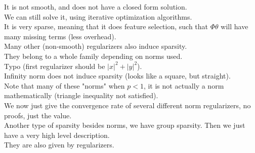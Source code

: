 \documentclass[12pt]{article}
\begin{document}
It is not smooth, and does not have
a closed form solution. \\
We can still solve it, using iterative
optimization algorithms. \\

It is very sparse, meaning that it does
feature selection, such that $\Phi \theta$
will have many missing terms (less overhead). \\

Many other (non-smooth) regularizers also
induce sparsity. \\
They belong to a whole family
depending on norms used. \\

Typo (first regularizer should be 
$|x|^2 + |y|^2$). \\

Infinity norm does not induce sparsity
(looks like a square, but straight). \\

Note that many of these "norms"
when $p < 1$, it is not actually a norm
mathematically (triangle inequality
not satisfied). \\

We now just give the convergence rate of
several different norm regularizers,
no proofs, just the value. \\

Another type of sparsity besides
norms, we have group sparsity.
Then we just have a very high level
description. \\
They are also given by regularizers. \\

\newpage
\end{document}

